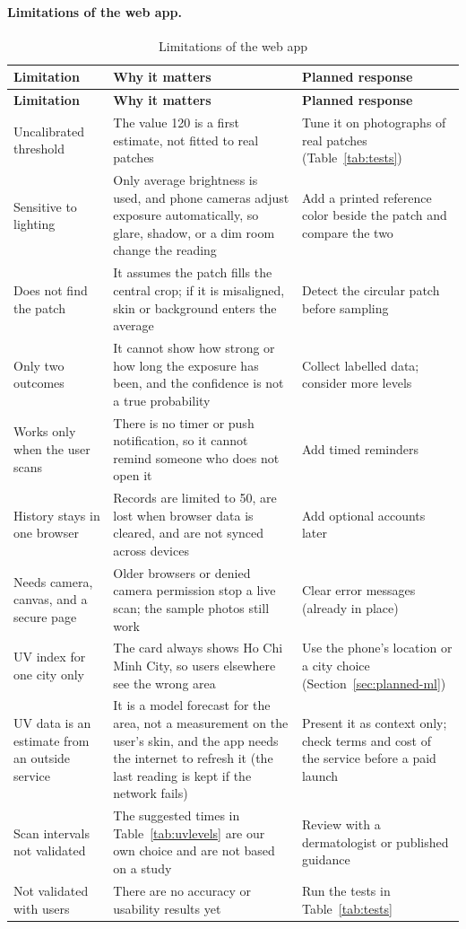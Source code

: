 \paragraph{Limitations of the web app.}
\begin{longtable}{@{}L{3.6cm}L{6.3cm}L{4.2cm}@{}}
\caption{Limitations of the web app}\label{tab:limits-web}\\
\toprule \textbf{Limitation} & \textbf{Why it matters} & \textbf{Planned response}\\ \midrule
\endfirsthead
\toprule \textbf{Limitation} & \textbf{Why it matters} & \textbf{Planned response}\\ \midrule
\endhead
\bottomrule
\endfoot
Uncalibrated threshold & The value 120 is a first estimate, not fitted to real patches & Tune it on photographs of real patches (Table~\ref{tab:tests})\\
\addlinespace
Sensitive to lighting & Only average brightness is used, and phone cameras adjust exposure automatically, so glare, shadow, or a dim room change the reading & Add a printed reference color beside the patch and compare the two\\
\addlinespace
Does not find the patch & It assumes the patch fills the central crop; if it is misaligned, skin or background enters the average & Detect the circular patch before sampling\\
\addlinespace
Only two outcomes & It cannot show how strong or how long the exposure has been, and the confidence is not a true probability & Collect labelled data; consider more levels\\
\addlinespace
Works only when the user scans & There is no timer or push notification, so it cannot remind someone who does not open it & Add timed reminders\\
\addlinespace
History stays in one browser & Records are limited to 50, are lost when browser data is cleared, and are not synced across devices & Add optional accounts later\\
\addlinespace
Needs camera, canvas, and a secure page & Older browsers or denied camera permission stop a live scan; the sample photos still work & Clear error messages (already in place)\\
\addlinespace
UV index for one city only & The card always shows Ho Chi Minh City, so users elsewhere see the wrong area & Use the phone's location or a city choice (Section~\ref{sec:planned-ml})\\
\addlinespace
UV data is an estimate from an outside service & It is a model forecast for the area, not a measurement on the user's skin, and the app needs the internet to refresh it (the last reading is kept if the network fails) & Present it as context only; check terms and cost of the service before a paid launch\\
\addlinespace
Scan intervals not validated & The suggested times in Table~\ref{tab:uvlevels} are our own choice and are not based on a study & Review with a dermatologist or published guidance\\
\addlinespace
Not validated with users & There are no accuracy or usability results yet & Run the tests in Table~\ref{tab:tests}\\
\end{longtable}


